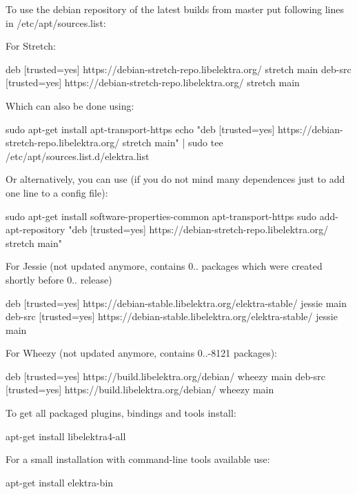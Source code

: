 To use the debian repository of the latest builds from master put following lines in {\ttfamily /etc/apt/sources.list}\+:

For Stretch\+: \begin{DoxyVerb}    deb     [trusted=yes] https://debian-stretch-repo.libelektra.org/ stretch main
    deb-src [trusted=yes] https://debian-stretch-repo.libelektra.org/ stretch main
\end{DoxyVerb}


Which can also be done using\+: \begin{DoxyVerb}    sudo apt-get install apt-transport-https
    echo "deb     [trusted=yes] https://debian-stretch-repo.libelektra.org/ stretch main" | sudo tee /etc/apt/sources.list.d/elektra.list
\end{DoxyVerb}


Or alternatively, you can use (if you do not mind many dependences just to add one line to a config file)\+: \begin{DoxyVerb}    sudo apt-get install software-properties-common apt-transport-https
    sudo add-apt-repository "deb     [trusted=yes] https://debian-stretch-repo.libelektra.org/ stretch main"
\end{DoxyVerb}


For Jessie (not updated anymore, contains 0.. packages which were created shortly before 0.. release) \begin{DoxyVerb}    deb     [trusted=yes] https://debian-stable.libelektra.org/elektra-stable/ jessie main
    deb-src [trusted=yes] https://debian-stable.libelektra.org/elektra-stable/ jessie main
\end{DoxyVerb}


For Wheezy (not updated anymore, contains 0..-\/8121 packages)\+: \begin{DoxyVerb}    deb     [trusted=yes] https://build.libelektra.org/debian/ wheezy main
    deb-src [trusted=yes] https://build.libelektra.org/debian/ wheezy main
\end{DoxyVerb}


To get all packaged plugins, bindings and tools install\+: \begin{DoxyVerb}apt-get install libelektra4-all
\end{DoxyVerb}


For a small installation with command-\/line tools available use\+: \begin{DoxyVerb}apt-get install elektra-bin
\end{DoxyVerb}


